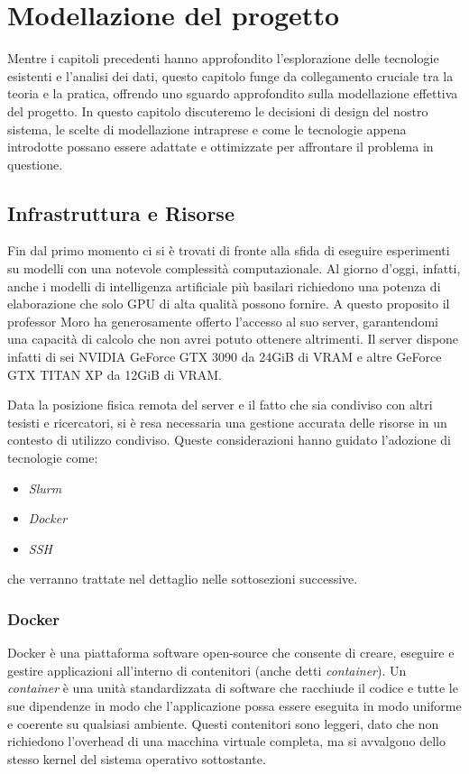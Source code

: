 \documentclass[12pt,a4paper,twoside,openright]{book}
\begin{document}
\chapter{Modellazione del progetto}
\label{cap:modellazione-prog}

Mentre i capitoli precedenti hanno approfondito l'esplorazione delle tecnologie esistenti e l'analisi dei dati, questo capitolo funge da collegamento cruciale tra la teoria e la pratica, offrendo uno sguardo approfondito sulla modellazione effettiva del progetto.
In questo capitolo discuteremo le decisioni di design del nostro sistema, le scelte di modellazione intraprese e come le tecnologie appena introdotte possano essere adattate e ottimizzate per affrontare il problema in questione. 


\section{Infrastruttura e Risorse}

Fin dal primo momento ci si è trovati di fronte alla sfida di eseguire esperimenti su modelli con una notevole complessità computazionale. 
Al giorno d'oggi, infatti, anche i modelli di intelligenza artificiale più basilari richiedono una potenza di elaborazione che solo GPU di alta qualità possono fornire.
A questo proposito il professor Moro ha generosamente offerto l'accesso al suo server, garantendomi una capacità di calcolo che non avrei potuto ottenere altrimenti.
Il server dispone infatti di sei NVIDIA GeForce GTX 3090 da 24GiB di VRAM e altre GeForce GTX TITAN XP da 12GiB di VRAM.

Data la posizione fisica remota del server e il fatto che sia condiviso con altri tesisti e ricercatori, si è resa necessaria una gestione accurata delle risorse in un contesto di utilizzo condiviso. Queste considerazioni hanno guidato l'adozione di tecnologie come:
\begin{itemize}
    \item \emph{Slurm}
    \item \emph{Docker}
    \item \emph{SSH}
\end{itemize}
che verranno trattate nel dettaglio nelle sottosezioni successive.

\subsection{Docker}

Docker è una piattaforma software open-source che consente di creare, eseguire e gestire applicazioni all'interno di contenitori (anche detti \emph{container}). Un \emph{container} è una unità standardizzata di software che racchiude il codice e tutte le sue dipendenze in modo che l'applicazione possa essere eseguita in modo uniforme e coerente su qualsiasi ambiente. Questi contenitori sono leggeri, dato che non richiedono l'overhead di una macchina virtuale completa, ma si avvalgono dello stesso kernel del sistema operativo sottostante. 
\end{document}
